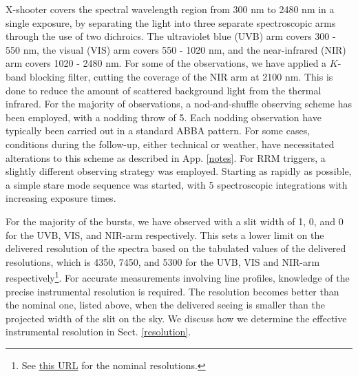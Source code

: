 \documentclass{aa}    %
\begin{document}
X-shooter covers the spectral wavelength region from 300 nm to 2480 nm in a
single exposure, by separating the light into three separate spectroscopic arms
through the use of two dichroics. The ultraviolet blue (UVB) arm covers 300 -
550 nm, the visual (VIS) arm covers 550 - 1020 nm, and the near-infrared (NIR)
arm covers 1020 - 2480 nm. For some of the observations, we have applied a
$K$-band blocking filter, cutting the coverage of the NIR arm at 2100 nm. This
is done to reduce the amount of scattered background light from the thermal
infrared. For the majority of observations, a nod-and-shuffle observing scheme
has been employed, with a nodding throw of 5\arcsec. Each nodding observation
have typically been carried out in a standard ABBA pattern. For some cases,
conditions during the follow-up, either technical or weather, have necessitated
alterations to this scheme as described in App. \ref{notes}. For RRM triggers, a
slightly different observing strategy was employed. Starting as rapidly as
possible, a simple stare mode sequence was started, with 5 spectroscopic
integrations with increasing exposure times. 

For the majority of the bursts, we have observed with a slit width of 1,
0, and 0 for the UVB, VIS, and NIR-arm respectively. This sets a
lower limit on the delivered resolution of the spectra based on the tabulated
values of the delivered resolutions, which is 4350, 7450, and 5300 for the UVB,
VIS and NIR-arm
respectively\footnote{See \href{https://www.eso.org/sci/facilities/paranal/instruments/xshooter/inst.html}{this URL} for the nominal resolutions.}. %
For accurate measurements involving line profiles, knowledge of the precise
instrumental resolution is required. The resolution becomes better than the
nominal one, listed above, when the delivered seeing is smaller than the
projected width of the slit on the sky. We discuss how we determine the
effective instrumental resolution in Sect. \ref{resolution}.
\end{document}
